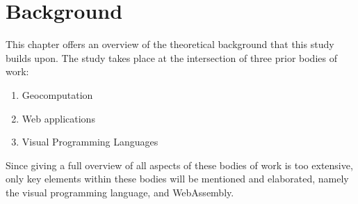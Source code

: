 
\chapter{Background}
\label{chap:background}


This chapter offers an overview of the theoretical background that this study builds upon.
The study takes place at the intersection of three prior bodies of work:
\begin{enumerate}[-]
  \item Geocomputation
  \item Web applications
  \item Visual Programming Languages
\end{enumerate}

Since giving a full overview of all aspects of these bodies of work is too extensive, only key elements within these bodies will be mentioned and elaborated, namely the visual programming language, and WebAssembly.  






